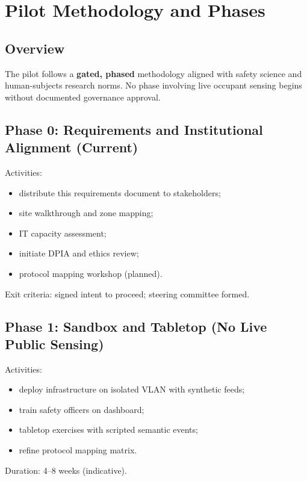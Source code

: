 \section{Pilot Methodology and Phases}
\label{sec:pilot-methodology}

\subsection{Overview}

The pilot follows a \textbf{gated, phased} methodology aligned with safety science and
human-subjects research norms.
No phase involving live occupant sensing begins without documented governance approval.

\subsection{Phase 0: Requirements and Institutional Alignment (Current)}

Activities:
\begin{itemize}[noitemsep]
  \item distribute this requirements document to stakeholders;
  \item site walkthrough and zone mapping;
  \item IT capacity assessment;
  \item initiate DPIA and ethics review;
  \item protocol mapping workshop (planned).
\end{itemize}

Exit criteria: signed intent to proceed; steering committee formed.

\subsection{Phase 1: Sandbox and Tabletop (No Live Public Sensing)}

Activities:
\begin{itemize}[noitemsep]
  \item deploy infrastructure on isolated VLAN with synthetic feeds;
  \item train safety officers on dashboard;
  \item tabletop exercises with scripted semantic events;
  \item refine protocol mapping matrix.
\end{itemize}

Duration: 4--8 weeks (indicative).

